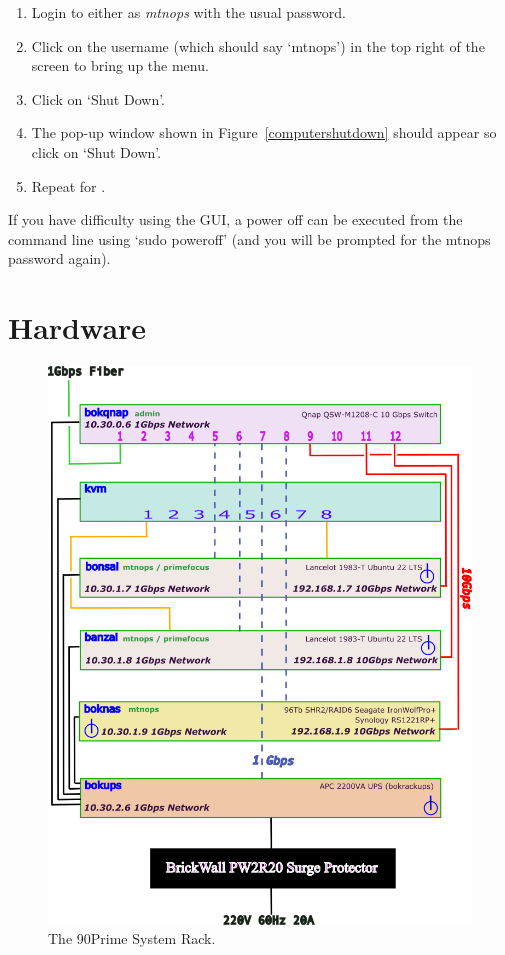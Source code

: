 \documentclass[12pt,twoside]{article}
\begin{document}
\begin{enumerate}
\item Login to either  as \emph{mtnops} with the usual password.
\item Click on the username (which should say `mtnops') in the top right of the screen to bring up the menu.
\item Click on `Shut Down'.
\item The pop-up window shown in Figure~\ref{computershutdown} should appear so click on `Shut Down'.
\item Repeat for .
\end{enumerate}

If you have difficulty using the GUI, a power off can be executed from the command line using `sudo poweroff'
(and you will be prompted for the mtnops password again).

\section{Hardware}
\label{Hardware}

\begin{figure}
 \centering
 \includegraphics[angle=0,scale=0.75]{bokrack.png}
 \caption{The 90Prime System Rack.}
 \label{bokrack}
\end{figure}
\end{document}
